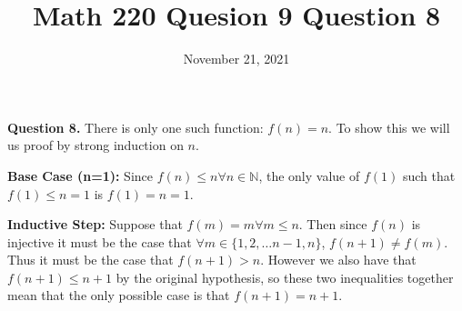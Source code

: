 \documentclass[letterpaper, reqno,11pt]{article}
\newcommand{\NN}{\mathbb{N}}
\begin{document}
\title{Math 220 Quesion 9 Question 8}
\date{November 21, 2021}
\maketitle

{\noindent\bf Question 8.} There is only one such function: $f(n)=n$. To show this we will us proof by strong induction on $n$. 

{\bf Base Case (n=1):} Since $f(n)\leq n\forall n\in\NN$, the only value of $f(1)$ such that $f(1)\leq n=1$ is $f(1)=n=1$. 

{\bf Inductive Step:} Suppose that $f(m)=m\forall m\leq n$. Then since $f(n)$ is injective it must be the case that $\forall m\in \{1, 2, \ldots n-1, n\}$, $f(n+1)\neq f(m)$. Thus it must be the case that $f(n+1)>n$. However we also have that $f(n+1)\leq n+1$ by the original hypothesis, so these two inequalities together mean that the only possible case is that $f(n+1)=n+1$. 
\end{document}

